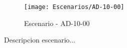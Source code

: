 \begin{figure}[H]
\centering
\texttt{[image: Escenarios/AD-10-00]}
\caption{Escenario - AD-10-00}
\label{fig:AD-10-00}
\end{figure}

Descripcion escenario...
\clearpage
